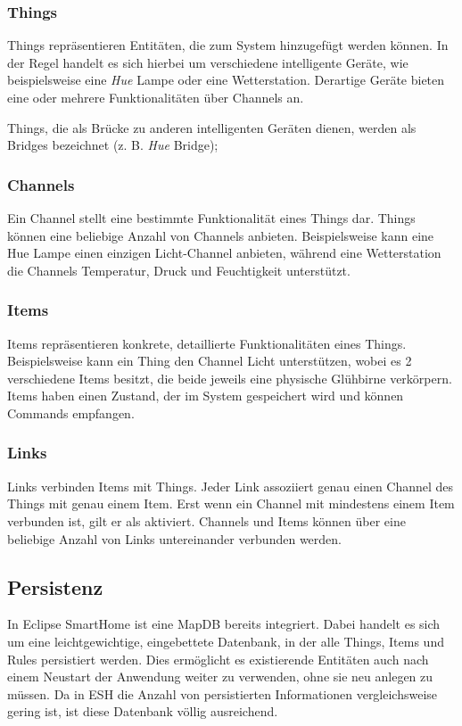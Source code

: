 \subsubsection{Things}
Things repräsentieren Entitäten, die zum System hinzugefügt werden können. In der Regel handelt es sich hierbei um verschiedene intelligente Geräte, wie beispielsweise eine \textit{Hue} Lampe oder eine Wetterstation. Derartige Geräte bieten eine oder mehrere Funktionalitäten über Channels an.

Things, die als Brücke zu anderen intelligenten Geräten dienen, werden als Bridges bezeichnet (z. B. \textit{Hue} Bridge);

\subsubsection{Channels}
Ein Channel stellt eine bestimmte Funktionalität eines Things dar. Things können eine beliebige Anzahl von Channels anbieten. Beispielsweise kann eine Hue Lampe einen einzigen \glqq Licht\grqq -Channel anbieten, während eine Wetterstation die Channels \glqq Temperatur\grqq , \glqq Druck\grqq{} und \glqq Feuchtigkeit\grqq{} unterstützt.

\subsubsection{Items}
Items repräsentieren konkrete, detaillierte Funktionalitäten eines Things. Beispielsweise kann ein Thing den Channel \glqq Licht\grqq{} unterstützen, wobei es 2 verschiedene Items besitzt, die beide jeweils eine physische Glühbirne verkörpern. Items haben einen Zustand, der im System gespeichert wird und können Commands empfangen.

\subsubsection{Links}
Links verbinden Items mit Things. Jeder Link assoziiert genau einen Channel des Things mit genau einem Item. Erst wenn ein Channel mit mindestens einem Item verbunden ist, gilt er als \glqq aktiviert\grqq{}. Channels und Items können über eine beliebige Anzahl von Links untereinander verbunden werden.


\subsection{Persistenz}
\label{subsec:persistenz}
In Eclipse SmartHome ist eine MapDB\cite{mapDB} bereits integriert. Dabei handelt es sich um eine leichtgewichtige, eingebettete Datenbank, in der alle Things, Items und Rules persistiert werden. Dies ermöglicht es existierende Entitäten auch nach einem Neustart der Anwendung weiter zu verwenden, ohne sie neu anlegen zu müssen. Da in ESH die Anzahl von persistierten Informationen vergleichsweise gering ist, ist diese Datenbank völlig ausreichend.


